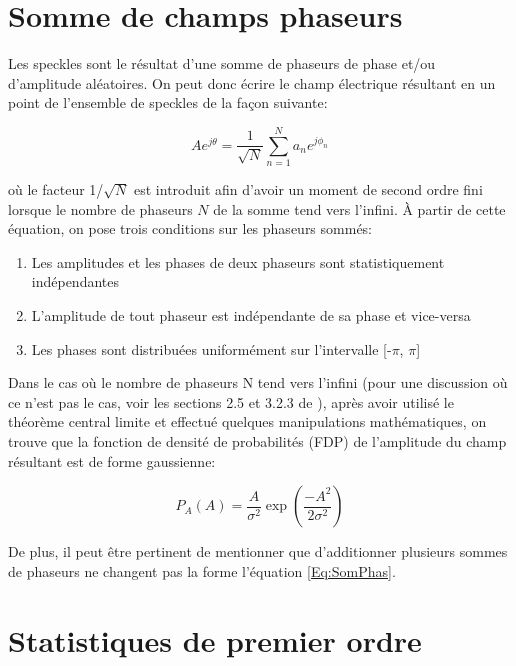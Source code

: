 \documentclass{article}       %
\begin{document}
\section{Somme de champs phaseurs}

Les speckles sont le résultat d'une somme de phaseurs de phase et/ou d'amplitude aléatoires. On peut donc écrire le champ électrique résultant en un point de l'ensemble de speckles de la façon suivante:

\begin{equation}
\label{Eq:SomPhas}
    A e^{j\theta} = \frac{1}{\sqrt{N}}\sum_{n=1}^{N}a_{n}e^{j\phi_{n}}
\end{equation}

où le facteur 1/$\sqrt{N}$ est introduit afin d'avoir un moment de second ordre fini lorsque le nombre de phaseurs $N$ de la somme tend vers l'infini. À partir de cette équation, on pose trois conditions sur les phaseurs sommés:\\
\begin{enumerate}
    \item Les amplitudes et les phases de deux phaseurs sont statistiquement indépendantes
    \item L'amplitude de tout phaseur est indépendante de sa phase et vice-versa
    \item Les phases sont distribuées uniformément sur l'intervalle [-$\pi$, $\pi$]
\end{enumerate}
\bigskip

Dans le cas où le nombre de phaseurs N tend vers l'infini (pour une discussion où ce n'est pas le cas, voir les sections 2.5 et 3.2.3 de \cite{Manuel}), après avoir utilisé le théorème central limite et effectué quelques manipulations mathématiques, on trouve que la fonction de densité de probabilités (FDP) de l'amplitude du champ résultant est de forme gaussienne:

\begin{equation}
\label{Eq:FDPAmp}
    P_{A}(A) = \frac{A}{\sigma^2}\exp\left(\frac{-A^2}{2\sigma^2}\right)
\end{equation}

De plus, il peut être pertinent de mentionner que d'additionner plusieurs sommes de phaseurs ne changent pas la forme l'équation \ref{Eq:SomPhas}.\\

\bigskip

\section{Statistiques de premier ordre}
\label{Sec:PremierOrdre}
\end{document}
